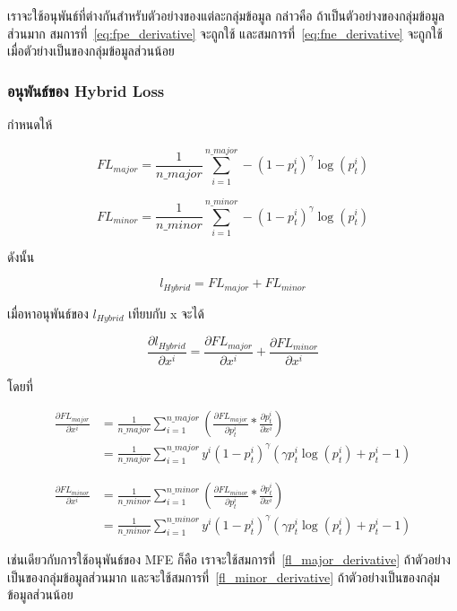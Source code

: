 เราจะใช้อนุพันธ์ที่ต่างกันสำหรับตัวอย่างของแต่ละกลุ่มข้อมูล กล่าวคือ ถ้าเป็นตัวอย่างของกลุ่มข้อมูลส่วนมาก สมการที่~\ref{eq:fpe_derivative} จะถูกใช้ และสมการที่~\ref{eq:fne_derivative} จะถูกใช้เมื่อตัวย่างเป็นของกลุ่มข้อมูลส่วนน้อย



\subsubsection{อนุพันธ์ของ Hybrid Loss}
กำหนดให้

\begin{equation}
    FL_{major} = \frac{1}{n\_major} \sum_{i = 1}^{n\_major} - (1 - p_{t}^{i})^{\gamma}\log (p_{t}^{i})
\end{equation}

\begin{equation}
    FL_{minor} = \frac{1}{n\_minor} \sum_{i = 1}^{n\_minor} - (1 - p_{t}^{i})^{\gamma}\log (p_{t}^{i})
\end{equation}

ดังนั้น

\begin{equation}
    l_{Hybrid} = FL_{major} + FL_{minor}
\end{equation}

เมื่อหาอนุพันธ์ของ $l_{Hybrid}$ เทียบกับ x จะได้

\begin{equation}
\frac{\partial l_{Hybrid}}{\partial x^{i}} = \frac{\partial FL_{major}}{\partial x^{i}} + \frac{\partial FL_{minor}}{\partial x^{i}}
\end{equation}

โดยที่

\begin{equation} \label{fl_major_derivative}
\begin{split}
\frac{\partial FL_{major}}{\partial x^{i}} & = \frac{1}{n\_major} \sum_{i = 1}^{n\_major} (\frac{\partial FL_{major}}{\partial p_{t}^{i}} * \frac{\partial p_{t}^{i}}{\partial x^{i}}) \\
& = \frac{1}{n\_major} \sum_{i = 1}^{n\_major} y^{i} (1 - p_{t}^{i})^{\gamma} (\gamma p_{t}^{i} \log (p_{t}^{i}) + p_{t}^{i} - 1)
\end{split}
\end{equation}

\begin{equation} \label{fl_minor_derivative}
\begin{split}
\frac{\partial FL_{minor}}{\partial x^{i}} & = \frac{1}{n\_minor} \sum_{i = 1}^{n\_minor} (\frac{\partial FL_{minor}}{\partial p_{t}^{i}} * \frac{\partial p_{t}^{i}}{\partial x^{i}}) \\
& = \frac{1}{n\_minor} \sum_{i = 1}^{n\_minor} y^{i} (1 - p_{t}^{i})^{\gamma} (\gamma p_{t}^{i} \log (p_{t}^{i}) + p_{t}^{i} - 1)
\end{split}
\end{equation}

เช่นเดียวกับการใช้อนุพันธ์ของ MFE ก็คือ เราจะใช้สมการที่~\ref{fl_major_derivative} ถ้าตัวอย่างเป็นของกลุ่มข้อมูลส่วนมาก และจะใช้สมการที่~\ref{fl_minor_derivative} ถ้าตัวอย่างเป็นของกลุ่มข้อมูลส่วนน้อย
